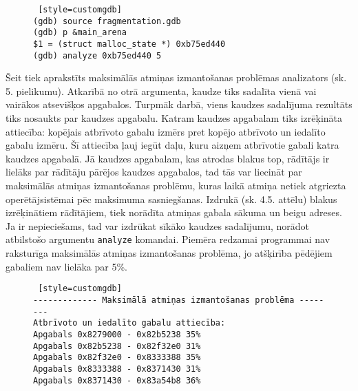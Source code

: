 \begin{figure}[h]
\begin{lstlisting} [style=customgdb]
(gdb) source fragmentation.gdb
(gdb) p &main_arena
$1 = (struct malloc_state *) 0xb75ed440
(gdb) analyze 0xb75ed440 5
\end{lstlisting}
\caption{\textbf{\fontsize{11}{12}\selectfont {Gdb skripta palaišana}}}
\end{figure} %


Šeit tiek aprakstīts maksimālās atmiņas izmantošanas problēmas analizators (sk. 5. pielikumu).
Atkarībā no otrā argumenta, kaudze tiks sadalīta vienā vai vairākos atsevišķos apgabalos.
Turpmāk darbā, viens kaudzes sadalījuma rezultāts tiks nosaukts par kaudzes apgabalu.
Katram kaudzes apgabalam tiks izrēķināta attiecība: kopējais atbrīvoto gabalu izmērs pret kopējo atbrīvoto un iedalīto gabalu izmēru.
Šī attiecība ļauj iegūt daļu, kuru aizņem atbrīvotie gabali katra kaudzes apgabalā.
Jā kaudzes apgabalam, kas atrodas blakus top, rādītājs ir lielāks par rādītāju pārējos kaudzes apgabalos, tad tās var liecināt par maksimālās atmiņas izmantošanas problēmu, kuras laikā atmiņa netiek atgriezta operētājsistēmai pēc maksimuma sasniegšanas.
Izdrukā (sk. 4.5. attēlu) blakus izrēķinātiem rādītājiem, tiek norādīta atmiņas gabala sākuma un beigu adreses.
Ja ir nepieciešams, tad var izdrūkat sīkāko kaudzes sadalījumu, norādot atbilstošo argumentu \texttt{analyze} komandai.
Piemēra redzamai programmai nav raksturīga maksimālās atmiņas izmantošanas problēma, jo atšķirība pēdējiem gabaliem nav lielāka par 5\%.

\begin{figure}[h]
\begin{lstlisting} [style=customgdb]
------------- Maksimālā atmiņas izmantošanas problēma --------
Atbrīvoto un iedalīto gabalu attiecība:
Apgabals 0x8279000 - 0x82b5238 35%
Apgabals 0x82b5238 - 0x82f32e0 31%
Apgabals 0x82f32e0 - 0x8333388 35%
Apgabals 0x8333388 - 0x8371430 31%
Apgabals 0x8371430 - 0x83a54b8 36%
\end{lstlisting}
\caption{\textbf{\fontsize{11}{12}\selectfont {Maksimālā atmiņas izmantošanas rādītājs}}}
\end{figure}

